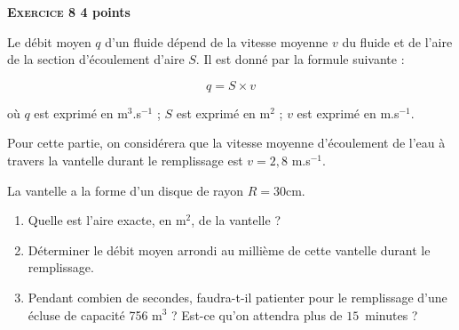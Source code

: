 \textbf{\textsc{Exercice 8} \hfill 4 points}

\medskip 

Le débit moyen $q$ d'un fluide dépend de la vitesse moyenne $v$ du fluide et de l'aire de la section d'écoulement d'aire $S$. Il est donné par la formule suivante : 

\[q = S \times v\]
 
où $q$ est exprimé en m$^3$.s$^{-1}$ ; $S$ est exprimé en m$^2$ ; $v$ est exprimé en m.s$^{-1}$. 

Pour cette partie, on considérera que la vitesse moyenne d'écoulement de l'eau à travers la vantelle durant le remplissage est $v = 2,8$ m.s$^{-1}$.
 
La vantelle a la forme d'un disque de rayon $R = 30$cm. 

\medskip

\begin{enumerate}
\item Quelle est l'aire exacte, en m$^2$, de la vantelle ? 
\item Déterminer le débit moyen arrondi au millième de cette vantelle durant le 
remplissage. 
\item Pendant combien de secondes, faudra-t-il patienter pour le remplissage d'une écluse de capacité 756 m$^3$ ? Est-ce qu'on attendra plus de $15$~minutes ?
\end{enumerate}
	 
\vspace{0,5cm}


